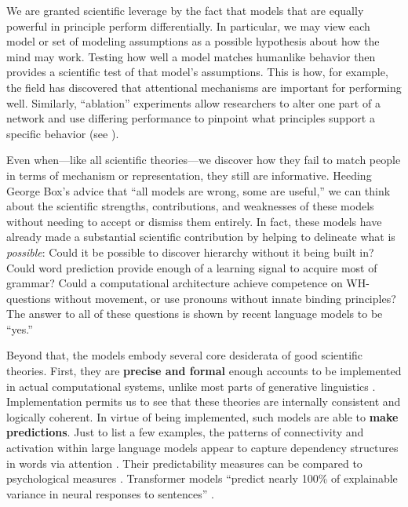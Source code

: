 \documentclass[output=paper,colorlinks,citecolor=brown
]{langscibook}
\begin{document}
We are granted scientific leverage by the fact that models that are equally powerful in principle perform differentially. In particular, we may view each model or set of modeling assumptions as a possible hypothesis about how the mind may work. Testing how well a model matches humanlike behavior then provides a scientific test of that model's assumptions. This is how, for example, the field has discovered that attentional mechanisms are important for performing well.  Similarly, ``ablation'' experiments allow researchers to alter one part of a network and use differing performance to pinpoint what principles support a specific behavior (see \cite{warstadt2022artificial}). 

Even when---like all scientific theories---we discover how they fail to match people in terms of mechanism or representation, they still are informative. Heeding George Box's advice that ``all models are wrong, some are useful,'' we can think about the scientific strengths, contributions, and weaknesses of these models without needing to accept or dismiss them entirely. In fact, these models have already made a substantial scientific contribution by helping to delineate what is \emph{possible}: Could it be possible to discover hierarchy without it being built in? Could word prediction provide enough of a learning signal to acquire most of grammar? Could a computational architecture achieve competence on WH-questions without movement, or use pronouns without innate binding principles? The answer to all of these questions is shown by recent language models to be ``yes.'' 

Beyond that, the models embody several core desiderata of good scientific theories. First, they are \textbf{precise and formal} enough accounts to be implemented in actual computational systems, unlike most parts of generative linguistics \citep{pullum1989formal}. Implementation permits us to see that these theories are internally consistent and logically coherent. In virtue of being implemented, such models are able to \textbf{make predictions}. Just to list a few examples, the patterns of connectivity and activation within large language models appear to capture dependency structures in words via attention \citep{manning2020emergent}. Their predictability measures can be compared to psychological measures \citep{hoover2022plausibility,shain2022large}. Transformer models ``predict nearly 100\% of explainable variance in neural responses to sentences'' \citep{schrimpf2021neural}. 
\end{document}
